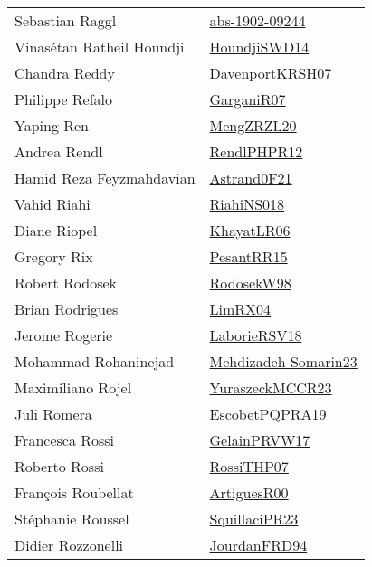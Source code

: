 {\begin{longtable}{p{4cm}p{20cm}}
Sebastian Raggl & \href{articles/abs-1902-09244.pdf}{abs-1902-09244}\cite{abs-1902-09244} \\
Vinas{\'{e}}tan Ratheil Houndji & \href{papers/HoundjiSWD14.pdf}{HoundjiSWD14}\cite{HoundjiSWD14} \\
Chandra Reddy & \href{papers/DavenportKRSH07.pdf}{DavenportKRSH07}\cite{DavenportKRSH07} \\
Philippe Refalo & \href{papers/GarganiR07.pdf}{GarganiR07}\cite{GarganiR07} \\
Yaping Ren & \href{articles/MengZRZL20.pdf}{MengZRZL20}\cite{MengZRZL20} \\
Andrea Rendl & \href{papers/RendlPHPR12.pdf}{RendlPHPR12}\cite{RendlPHPR12} \\
Hamid Reza Feyzmahdavian & \href{papers/Astrand0F21.pdf}{Astrand0F21}\cite{Astrand0F21} \\
Vahid Riahi & \href{papers/RiahiNS018.pdf}{RiahiNS018}\cite{RiahiNS018} \\
Diane Riopel & \href{articles/KhayatLR06.pdf}{KhayatLR06}\cite{KhayatLR06} \\
Gregory Rix & \href{papers/PesantRR15.pdf}{PesantRR15}\cite{PesantRR15} \\
Robert Rodosek & \href{papers/RodosekW98.pdf}{RodosekW98}\cite{RodosekW98} \\
Brian Rodrigues & \href{papers/LimRX04.pdf}{LimRX04}\cite{LimRX04} \\
Jerome Rogerie & \href{articles/LaborieRSV18.pdf}{LaborieRSV18}\cite{LaborieRSV18} \\
Mohammad Rohaninejad & \href{papers/Mehdizadeh-Somarin23.pdf}{Mehdizadeh-Somarin23}\cite{Mehdizadeh-Somarin23} \\
Maximiliano Rojel & \href{articles/YuraszeckMCCR23.pdf}{YuraszeckMCCR23}\cite{YuraszeckMCCR23} \\
Juli Romera & \href{articles/EscobetPQPRA19.pdf}{EscobetPQPRA19}\cite{EscobetPQPRA19} \\
Francesca Rossi & \href{papers/GelainPRVW17.pdf}{GelainPRVW17}\cite{GelainPRVW17} \\
Roberto Rossi & \href{papers/RossiTHP07.pdf}{RossiTHP07}\cite{RossiTHP07} \\
Fran{\c{c}}ois Roubellat & \href{articles/ArtiguesR00.pdf}{ArtiguesR00}\cite{ArtiguesR00} \\
St{\'{e}}phanie Roussel & \href{papers/SquillaciPR23.pdf}{SquillaciPR23}\cite{SquillaciPR23} \\
Didier Rozzonelli & \href{}{JourdanFRD94}\cite{JourdanFRD94} \\

\end{longtable}}
